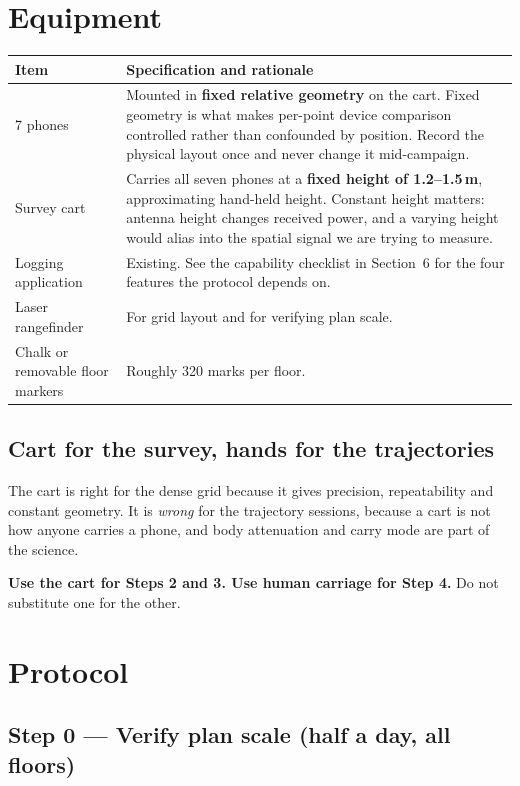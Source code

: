 \documentclass[11pt,a4paper]{article}
\begin{document}
\section{Equipment}

\begin{center}\small
\begin{tabular}{@{}p{3.6cm}p{12.4cm}@{}}
\toprule
Item & Specification and rationale \\ \midrule
7 phones & Mounted in \textbf{fixed relative geometry} on the cart. Fixed geometry is what
makes per-point device comparison controlled rather than confounded by position. Record
the physical layout once and never change it mid-campaign. \\
Survey cart & Carries all seven phones at a \textbf{fixed height of 1.2--1.5\,m},
approximating hand-held height. Constant height matters: antenna height changes received
power, and a varying height would alias into the spatial signal we are trying to measure. \\
Logging application & Existing. See the capability checklist in Section~6 for the four
features the protocol depends on. \\
Laser rangefinder & For grid layout and for verifying plan scale. \\
Chalk or removable floor markers & Roughly 320 marks per floor. \\
\bottomrule
\end{tabular}
\end{center}

\subsection{Cart for the survey, hands for the trajectories}

The cart is right for the dense grid because it gives precision, repeatability and
constant geometry. It is \emph{wrong} for the trajectory sessions, because a cart is not
how anyone carries a phone, and body attenuation and carry mode are part of the science.

\textbf{Use the cart for Steps 2 and 3. Use human carriage for Step 4.} Do not substitute
one for the other.

\section{Protocol}

\subsection{Step 0 --- Verify plan scale (half a day, all floors)}
\end{document}
